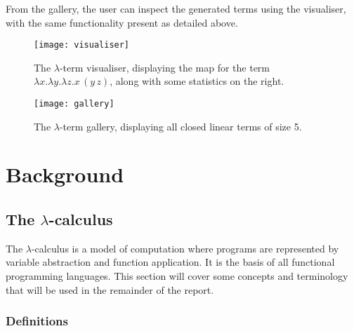 \documentclass[12pt]{article}
\begin{document}
From the gallery, the user can inspect the generated terms using the visualiser, with the same functionality present as detailed above.

\begin{figure}
    \centering
    \texttt{[image: visualiser]}
    \caption{The $\lambda$-term visualiser, displaying the map for the term $\lambda x. \lambda y. \lambda z. x \, (y \, z)$, along with some statistics on the right.}
    \label{fig:visualiser}
\end{figure}

\begin{figure}
    \centering
    \texttt{[image: gallery]}
    \caption{The $\lambda$-term gallery, displaying all closed linear terms of size 5.}
    \label{fig:gallery}
\end{figure}

\newpage

\section{Background}
\label{sec:background}

\subsection{The \texorpdfstring{$\lambda$}{lambda}-calculus}
The $\lambda$-calculus is a model of computation where programs are represented by variable abstraction and function application. It is the basis of all functional programming languages. This section will cover some concepts and terminology that will be used in the remainder of the report.

\subsubsection{Definitions}
\label{sec:defs}
\end{document}
